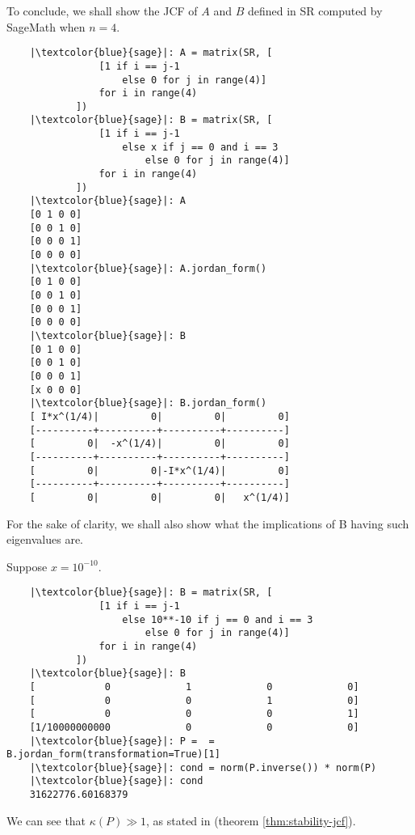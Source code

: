 \begin{example}
To conclude, we shall show the JCF of \(A\) and \(B\) defined in SR computed by SageMath when \(n = 4\).

\begin{verbatim}
    |\textcolor{blue}{sage}|: A = matrix(SR, [
                [1 if i == j-1
                    else 0 for j in range(4)]
                for i in range(4)
            ])
    |\textcolor{blue}{sage}|: B = matrix(SR, [
                [1 if i == j-1
                    else x if j == 0 and i == 3
                        else 0 for j in range(4)]
                for i in range(4)
            ])
    |\textcolor{blue}{sage}|: A
    [0 1 0 0]
    [0 0 1 0]
    [0 0 0 1]
    [0 0 0 0]
    |\textcolor{blue}{sage}|: A.jordan_form()
    [0 1 0 0]
    [0 0 1 0]
    [0 0 0 1]
    [0 0 0 0]
    |\textcolor{blue}{sage}|: B
    [0 1 0 0]
    [0 0 1 0]
    [0 0 0 1]
    [x 0 0 0]
    |\textcolor{blue}{sage}|: B.jordan_form()
    [ I*x^(1/4)|         0|         0|         0]
    [----------+----------+----------+----------]
    [         0|  -x^(1/4)|         0|         0]
    [----------+----------+----------+----------]
    [         0|         0|-I*x^(1/4)|         0]
    [----------+----------+----------+----------]
    [         0|         0|         0|   x^(1/4)]

\end{verbatim}

For the sake of clarity, we shall also show what the implications of B having such eigenvalues are.

Suppose \(x = 10^{-10}\).

\begin{verbatim}
    |\textcolor{blue}{sage}|: B = matrix(SR, [
                [1 if i == j-1
                    else 10**-10 if j == 0 and i == 3
                        else 0 for j in range(4)]
                for i in range(4)
            ])
    |\textcolor{blue}{sage}|: B
    [            0             1             0             0]
    [            0             0             1             0]
    [            0             0             0             1]
    [1/10000000000             0             0             0]
    |\textcolor{blue}{sage}|: P =  = B.jordan_form(transformation=True)[1]
    |\textcolor{blue}{sage}|: cond = norm(P.inverse()) * norm(P)
    |\textcolor{blue}{sage}|: cond
    31622776.60168379
\end{verbatim}
We can see that \(\kappa(P) \gg 1\), as stated in  (theorem \ref{thm:stability-jcf}).

\end{example}